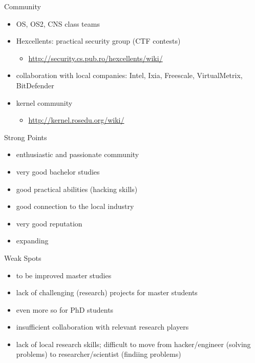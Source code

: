 \documentclass{simple}
\begin{document}
\begin{frame}{Community}
  \begin{itemize}
    \pause \item OS, OS2, CNS class teams
    \pause \item Hexcellents: practical security group (CTF contests)
      \begin{itemize}
        \item \url{http://security.cs.pub.ro/hexcellents/wiki/}
      \end{itemize}
    \pause \item collaboration with local companies: Intel, Ixia, Freescale,
      VirtualMetrix, BitDefender
    \pause \item kernel community
      \begin{itemize}
        \item \url{http://kernel.rosedu.org/wiki/}
      \end{itemize}
  \end{itemize}
\end{frame}

\begin{frame}{Strong Points}
  \begin{itemize}
    \pause \item enthusiastic and passionate community
    \pause \item very good bachelor studies
    \pause \item good practical abilities (hacking skills)
    \pause \item good connection to the local industry
    \pause \item very good reputation
    \pause \item expanding
  \end{itemize}
\end{frame}

\begin{frame}{Weak Spots}
  \begin{itemize}
    \pause \item to be improved master studies
    \pause \item lack of challenging (research) projects for master students
    \pause \item even more so for PhD students
    \pause \item insufficient collaboration with relevant research players
    \pause \item lack of local research skills; difficult to move from
      hacker/engineer (solving problems) to researcher/scientist (findiing
      problems)
  \end{itemize}
\end{frame}
\end{document}
